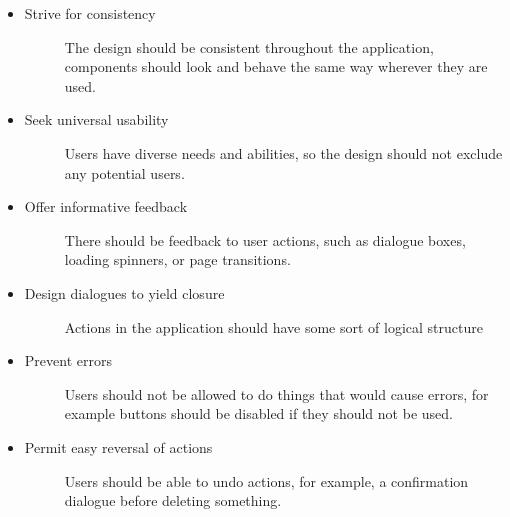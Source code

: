 \iffalse
\begin{itemize}
    \item Strive for consistency
    \begin{description}
        \item[] The design should be consistent throughout the application, components should look and behave the same way wherever they are used.
    \end{description}
    \item Seek universal usability
    \begin{description}
        \item[] Users have diverse needs and abilities, so the design should not exclude any potential users.
    \end{description}
    \item Offer informative feedback
    \begin{description}
        \item[] There should be feedback to user actions, such as dialogue boxes, loading spinners, or page transitions.
    \end{description}
    \item Design dialogues to yield closure
    \begin{description}
        \item[] Actions in the application should have some sort of logical structure
    \end{description}
    \item Prevent errors
    \begin{description}
        \item[] Users should not be allowed to do things that would cause errors, for example buttons should be disabled if they should not be used.
    \end{description}
    \item Permit easy reversal of actions
    \begin{description}
        \item[] Users should be able to undo actions, for example, a confirmation dialogue before deleting something.

\end{description}
\end{itemize}
